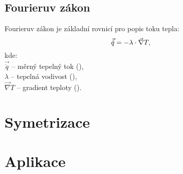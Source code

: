 \documentclass{article}
\begin{document}
\subsection{Fourieruv zákon}
Fourieruv zákon je základní rovnicí pro popis toku tepla:
\begin{equation}
    \vec{\dot{q}} = - \lambda \cdot \vec{\nabla} T,
    \tagaddtext{(\ueqWandMinvsq)}
\end{equation}
kde:\\
$\vec{\dot{q}}$ -- měrný tepelný tok (\ueqWandMinvsq),\\
$\lambda$ -- tepelná vodivost (\ueqWandMinvKinv),\\
$\vec{\nabla} T$ -- gradient teploty (\ueqKandMinv).

\newpage



\section{Symetrizace}

\newpage



\section{Aplikace}
\end{document}
